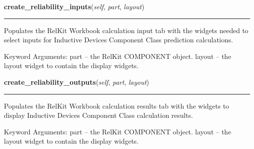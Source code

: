 \hspace{.8\funcindent}\begin{boxedminipage}{\funcwidth}

    \raggedright \textbf{create\_reliability\_inputs}(\textit{self}, \textit{part}, \textit{layout})

    \vspace{-1.5ex}

    \rule{\textwidth}{0.5\fboxrule}
\setlength{\parskip}{2ex}
    Populates the RelKit Workbook calculation input tab with the widgets
    needed to select inputs for Inductive Devices Component Class 
    prediction calculations.

    Keyword Arguments: part   -- the RelKit COMPONENT object. layout -- 
    the layout widget to contain the display widgets.

\setlength{\parskip}{1ex}
    \end{boxedminipage}

    \label{reliafree:inductors:inductor:Inductor:create_reliability_outputs}

    \vspace{0.5ex}

\hspace{.8\funcindent}\begin{boxedminipage}{\funcwidth}

    \raggedright \textbf{create\_reliability\_outputs}(\textit{self}, \textit{part}, \textit{layout})

    \vspace{-1.5ex}

    \rule{\textwidth}{0.5\fboxrule}
\setlength{\parskip}{2ex}
    Populates the RelKit Workbook calculation results tab with the 
    widgets to display Inductive Devices Component Class calculation 
    results.

    Keyword Arguments: part   -- the RelKit COMPONENT object. layout -- 
    the layout widget to contain the display widgets.

\setlength{\parskip}{1ex}
    \end{boxedminipage}

    \label{reliafree:inductors:inductor:Inductor:entry_callback}

